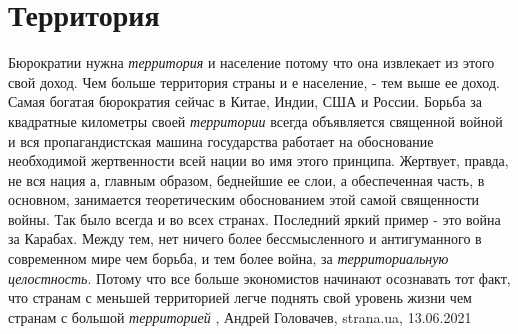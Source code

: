  
 
 
 
 
\chapter{Территория}

Бюрократии нужна \emph{территория} и население потому что она извлекает из этого свой
доход. Чем больше территория страны и е население, - тем выше ее доход. Самая
богатая бюрократия сейчас в Китае, Индии, США и России. Борьба за квадратные
километры своей \emph{территории} всегда объявляется священной войной и вся
пропагандистская машина государства работает на обоснование необходимой
жертвенности всей нации во имя этого принципа. Жертвует, правда, не вся нация
а, главным образом, беднейшие ее слои, а обеспеченная часть, в основном,
занимается теоретическим обоснованием этой самой священности войны. Так было
всегда и во всех странах. Последний яркий пример - это война за Карабах.  Между
тем, нет ничего более бессмысленного и антигуманного в современном мире чем
борьба, и тем более война, за \emph{территориальную целостность}. Потому что все
больше экономистов начинают осознавать тот факт, что странам с меньшей
территорией легче поднять свой уровень жизни чем странам с большой \emph{территорией}
, 
Андрей Головачев, strana.ua, 13.06.2021

